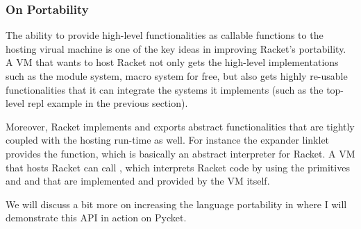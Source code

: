 \subsubsection{On Portability}
\label{subsec:portability}

The ability to provide high-level functionalities as callable
functions to the hosting virual machine is one of the key ideas in
improving Racket's portability. A VM that wants to host Racket not
only gets the high-level implementations such as the module system,
macro system for free, but also gets highly re-usable functionalities
that it can integrate the systems it implements (such as the top-level
repl example in the previous section).

Moreover, Racket implements and exports abstract functionalities that
are tightly coupled with the hosting run-time as well. For instance
the expander linklet provides the  function, which is
basically an abstract interpreter for Racket. A VM that hosts Racket
can call , which interprets Racket code by using the
primitives and 
and  that are implemented and provided
by the VM itself.

We will discuss a bit more on increasing the language portability in
 where I will demonstrate this API in action on
Pycket.
